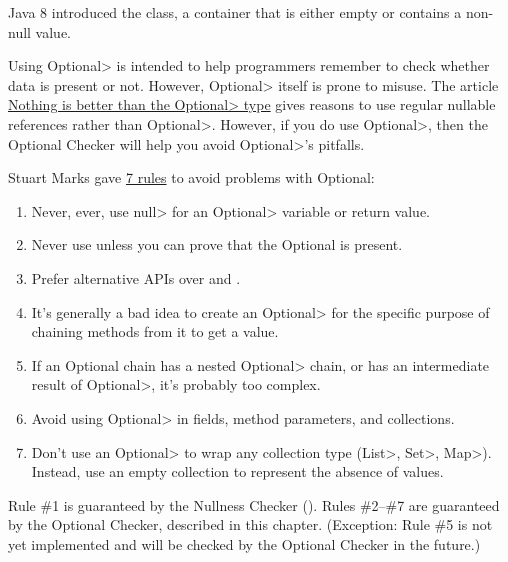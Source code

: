 \htmlhr
{}

Java 8 introduced the 
class, a container that is either empty or contains a non-null value.

Using \<Optional> is intended to help programmers remember to check whether
data is present or not.  However, \<Optional> itself is prone to misuse.
The article
\href{https://homes.cs.washington.edu/~mernst/advice/nothing-is-better-than-optional.html}{Nothing
  is better than the \<Optional> type} gives reasons to use
regular nullable references rather than \<Optional>.  However, if you do use
\<Optional>, then the Optional Checker will help you avoid
\<Optional>'s pitfalls.

Stuart Marks gave
\href{https://stuartmarks.wordpress.com/2016/09/27/vjug24-session-on-optional/}{7
  rules} to avoid problems with Optional:
\begin{enumerate}
\item
  Never, ever, use \<null> for an \<Optional> variable or return value.
\item
  Never use  unless you can prove that the Optional is present.
\item
  Prefer alternative APIs over
  and .
\item
  It's generally a bad idea to create an \<Optional> for the specific
  purpose of chaining methods from it to get a value.
\item
  If an Optional chain has a nested \<Optional> chain, or has an
  intermediate result of \<Optional>, it's probably too complex.
\item
  Avoid using \<Optional> in fields, method parameters, and collections.
\item
  Don't use an \<Optional> to wrap any collection type (\<List>, \<Set>,
  \<Map>).  Instead, use an empty collection to represent the absence of
  values.
\end{enumerate}

Rule \#1 is guaranteed by the Nullness Checker
().
Rules \#2--\#7 are guaranteed by the Optional Checker, described in this chapter.
(Exception:  Rule \#5 is not yet implemented and will be checked by the
Optional Checker in the future.)

